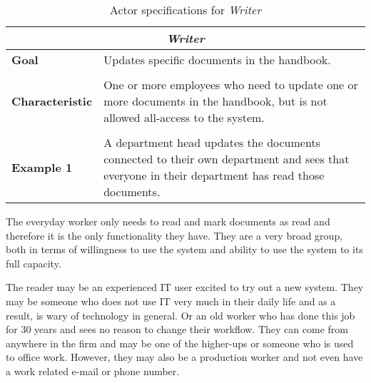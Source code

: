 \begin{table}[H]
	\centering
	\begin{tabular}{l p{11.3cm}}
		\hline
		\multicolumn{2}{c}{\textbf{\textit{Writer}}}\\
		\hline
		\textbf{Goal} & Updates specific documents in the handbook. \\
	 	 &  \\

		\textbf{Characteristic} &  One or more employees who need to update one or more documents in the handbook, but is not allowed all-access to the system. \\
		 &  \\

		\textbf{Example 1}
		& A department head updates the documents connected to their own department and sees that everyone in their department has read those documents.\\

		\hline
	\end{tabular}
	\caption{Actor specifications for \textit{Writer}}\label{tab:Actor-write}
\end{table}

The everyday worker only needs to read and mark documents as read and therefore it is the only functionality they have.
They are a very broad group, both in terms of willingness to use the system and ability to use the system to its full capacity.

The reader may be an experienced IT user excited to try out a new system.
They may be someone who does not use IT very much in their daily life and as a result, is wary of technology in general.
Or an old worker who has done this job for 30 years and sees no reason to change their workflow.
They can come from anywhere in the firm and may be one of the higher-ups or someone who is used to office work.
However, they may also be a production worker and not even have a work related e-mail or phone number.

